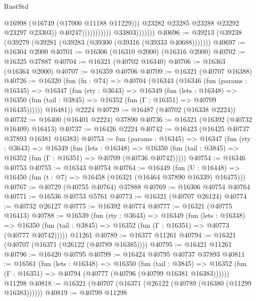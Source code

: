 \begin{lexlean}{RustStd}
\begin{coremodule}
                                              @16998
                                              (@16749 (@17000 @11188 @11229)))
                                            @23282
                                            @23285
                                            @23288
                                            @23292
                                            @23297
                                            @23303))
                                        @40247)))))))))))
                  @33803)))))))
@40696 := @39213 (@39238 (@39279 (@39281 (@39283 (@39300 (@39316 (@39333 @40688)))))))
@40697 := @16304 @2000
@40701 := @16306 (@16310 @2000) (@16316 @2000)
@40702 := @16325 @37887
@40704 := @16321 (@40702 @16340)
@40706 := @16363 (@16364 @2000)
@40707 := @16359 @40706
@40709 := @16321 (@40707 @16388)
@40726 := @16320
    (fun (fn : @74) =>
    @40704
      (@16343
        (@16346
          (fun (params : @16345) =>
          @16347
            (fun (rty : @3643) =>
            @16349
              (fun (lets : @16348) =>
              @16350 (fun (tail : @3845) => @16352 (fun (Γ : @16351) => @40709 @16435))))))
        @16481))
    @2224
@40729 := @16487 (@40702 (@16338 @2224))
@40732 := @16400 (@16401 @2224) @37890
@40736 := @16321 (@16392 (@40732 @16409) @16413)
@40737 := @16426 @2224
@40742 := @16423 (@16425 @40737 @37893 @16381 @16383)
@40753 := fun (params : @16345) =>
  @16347
    (fun (rty : @3643) =>
    @16349
      (fun (lets : @16348) =>
      @16350 (fun (tail : @3845) => @16352 (fun (Γ : @16351) => @40709 (@40736 @40742)))))
@40754 := @16346 @40753
@40755 := @16343 @40754
@40764 := @16449
    (fun (U : @16448) => @16450 (fun (t : @7) => @16458 (@16321 (@16464 @37890 @16339) @16475)))
@40767 := @40729 (@40755 @40764) @37888
@40769 := @16306 @40754 @40764
@40771 := @16536 @40753 @5761
@40773 := @16321 (@40707 @26124)
@40774 := @40732 @26127
@40775 := @16392 @40774
@40777 := @16321 (@40775 @16413)
@40788 := @16539
    (fun (rty : @3643) =>
    @16349
      (fun (lets : @16348) =>
      @16350 (fun (tail : @3845) => @16352 (fun (Γ : @16351) => @40773 (@40777 @40742)))))
    @11261
@40789 := @16377 @11261
@40794 := @16321 (@40707 (@16371 (@26122 (@40789 @16385))))
@40795 := @16421 @11261
@40796 := @16420 @40795
@40799 := @16424 @40795 @40737 @37893
@40811 := @16561
    (fun (lets : @16348) =>
    @16350
      (fun (tail : @3845) =>
      @16352 (fun (Γ : @16351) => @40794 (@40777 (@40796 (@40799 @16381 @16383))))))
    @11298
@40818 := @16321 (@40707 (@16371 (@26122 (@40789 (@16380 (@11299 @16383))))))
@40819 := @40799 @11298

\end{coremodule}
\end{lexlean}
